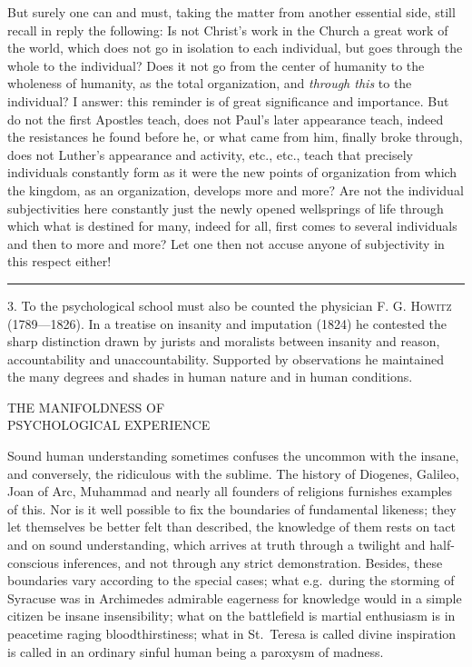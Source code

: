 \documentclass[12pt,a4paper,openany]{book}
\newcommand{\opage}[1]{\marginnote{\footnotesize\textit{[#1]}}}
\newcommand{\excerpthead}[1]{\par\bigskip\begin{center}#1\end{center}\nopagebreak\smallskip}
\newenvironment{intro}{\par}{\par}
\newcommand{\sectionrule}{\par\begin{center}\rule{4em}{0.4pt}\end{center}}
\begin{document}
But surely one can and must, taking the matter from another essential side, still
recall in reply the following: Is not Christ's work in the Church a great work of the
world, which does not go in isolation to each individual, but goes through the whole
to the individual? Does it not go from the center of humanity to the wholeness of
humanity, as the total organization, and \emph{through this} to the individual? I
answer: this reminder is of great significance and importance. But do not the first
Apostles teach, does not Paul's later appearance teach, indeed the resistances he
found before he, or what came from him, finally broke through, does not Luther's
appearance and activity, etc., etc., teach that precisely individuals constantly form
as it were the new points of organization from which the kingdom, as an organization,
develops more and more? Are not the individual subjectivities here constantly just
the newly opened wellsprings of life through which what is destined for many, indeed
for all, first comes to several individuals and then to more and more? Let one then
not accuse anyone of subjectivity in this respect either!

\sectionrule

\begin{intro}

3. To the psychological school must also be counted the physician \textsc{F. G.
Howitz} (1789---1826). In a treatise on insanity and imputation (1824) he contested
the sharp distinction drawn by jurists and moralists between insanity and reason,
accountability and unaccountability. Supported by observations he maintained the many
degrees and shades in human nature and in human conditions.

\end{intro}

\setcounter{footnote}{0}%
\excerpthead{THE MANIFOLDNESS OF \\ PSYCHOLOGICAL EXPERIENCE}\opage{142}

Sound human understanding sometimes confuses the uncommon with the insane, and
conversely, the ridiculous with the sublime. The history of Diogenes, Galileo, Joan
of Arc, Muhammad and nearly all founders of religions furnishes examples of this. Nor
is it well possible to fix the boundaries of fundamental likeness; they let
themselves be better felt than described, the knowledge of them rests on tact and on
sound understanding, which arrives at truth through a twilight and half-conscious
inferences, and not through any strict demonstration. Besides, these boundaries vary
according to the special cases; what e.g.\ during the storming of Syracuse was in
Archimedes admirable eagerness for knowledge would in a simple citizen be insane
insensibility; what on the battlefield is martial enthusiasm is in peacetime raging
bloodthirstiness; what in St.\ Teresa is called divine inspiration is called in an
ordinary sinful human being a paroxysm of madness.
\end{document}
